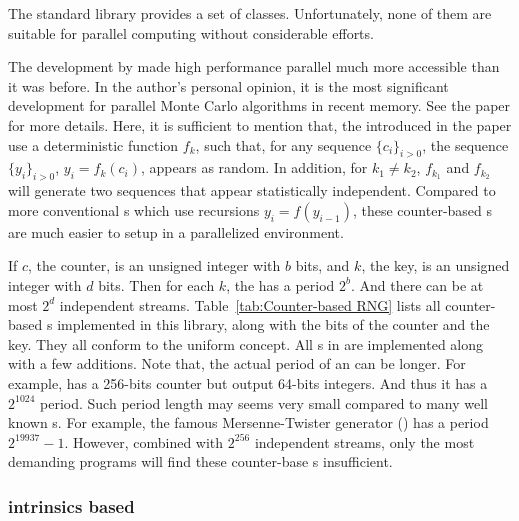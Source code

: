 The standard library provides a set of \rng classes. Unfortunately, none of
them are suitable for parallel computing without considerable efforts.

The development by \textcite{Salmon:2011um} made high performance parallel \rng
much more accessible than it was before. In the author's personal opinion, it
is the most significant development for parallel Monte Carlo algorithms in
recent memory. See the paper for more details. Here, it is sufficient to
mention that, the \rng introduced in the paper use a deterministic function
$f_k$, such that, for any sequence $\{c_i\}_{i>0}$, the sequence
$\{y_i\}_{i>0}$, $y_i = f_k(c_i)$, appears as random. In addition, for $k_1 \ne
k_2$, $f_{k_1}$ and $f_{k_2}$ will generate two sequences that appear
statistically independent. Compared to more conventional \rng{}s which use
recursions $y_i = f(y_{i - 1})$, these counter-based \rng{}s are much easier to
setup in a parallelized environment.

If $c$, the counter, is an unsigned integer with $b$ bits, and $k$, the key, is
an unsigned integer with $d$ bits. Then for each $k$, the \rng has a period
$2^b$. And there can be at most $2^d$ independent streams.
Table~\ref{tab:Counter-based RNG} lists all counter-based \rng{}s implemented
in this library, along with the bits of the counter and the key. They all
conform to the \cppoo uniform \rng concept. All \rng{}s in
\textcite{Salmon:2011um} are implemented along with a few additions. Note that,
the actual period of an \rng can be longer. For example, 
has a 256-bits counter but output 64-bits integers. And thus it has a
$2^{1024}$ period. Such period length may seems very small compared to many
well known \rng{}s. For example, the famous Mersenne-Twister generator
() has a period $2^{19937} - 1$. However, combined with
$2^{256}$ independent streams, only the most demanding programs will find these
counter-base \rng{}s insufficient.

\subsubsection{\protect\aesni intrinsics based \protect\rng}
\label{ssub:AES-NI intrinsics based RNG}

